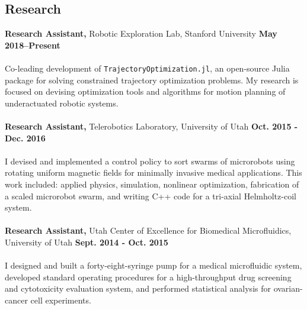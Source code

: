 \documentclass[margin,line]{res}
\begin{document}
\begin{resume}
\section{\sc Research}
{\bf Research Assistant,} Robotic Exploration Lab, Stanford University
\hfill {\bf May 2018--Present}\\
\\
Co-leading development of \texttt{TrajectoryOptimization.jl}, an open-source Julia package for solving constrained trajectory optimization problems. My research is focused on devising optimization tools and algorithms for motion planning of underactuated robotic systems.\\
\\
{\bf Research Assistant,} Telerobotics Laboratory, University of Utah
\hfill {\bf Oct. 2015 - Dec. 2016}\\
\\
I devised and implemented a control policy to sort swarms of microrobots using rotating uniform
magnetic fields for minimally invasive medical applications. This work included: applied physics, simulation, nonlinear optimization, fabrication of a scaled microrobot swarm, and writing C++ code for a tri-axial Helmholtz-coil system.\\
\\
{\bf Research Assistant,} Utah Center of Excellence for Biomedical Microfluidics, University of Utah
\hfill {\bf Sept. 2014 - Oct. 2015}\\
\\
I designed and built a forty-eight-syringe pump for a medical microfluidic system, developed standard operating procedures for a high-throughput drug screening and cytotoxicity evaluation system, and performed statistical analysis for ovarian-cancer cell experiments.\\


\end{resume}
\end{document}
